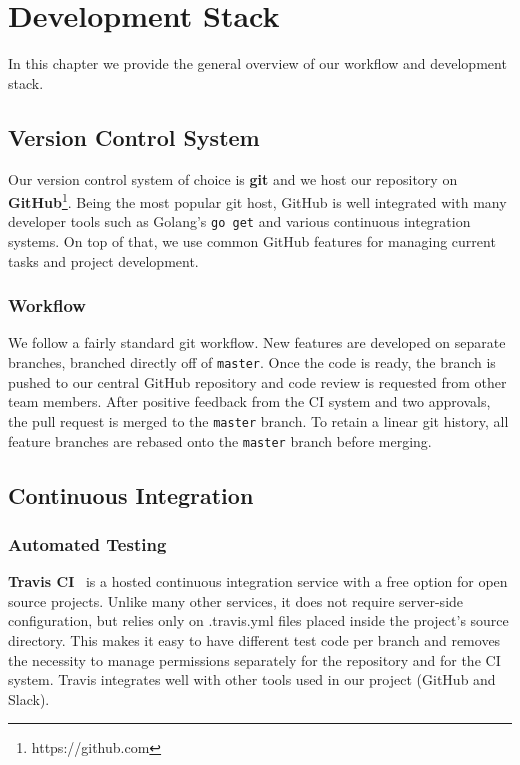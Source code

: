 \chapter{Development Stack}

In this chapter we provide the general overview of our workflow and
development stack.

\section{Version Control System}
Our version control system of choice is \textbf{git} and we host our repository on
\textbf{GitHub}\footnote{https://github.com}. Being the most popular git host,
GitHub is well integrated  with many developer tools such as Golang’s
\texttt{go get} and various continuous integration systems. On top of that,
we use common GitHub features for managing current tasks and project development.

\subsection{Workflow}
We follow a fairly standard git workflow. New features are developed on
separate branches, branched directly off of \texttt{master}. Once the code
is ready, the branch is pushed to our central GitHub repository and code
review is requested from other team members. After positive feedback from
the CI system and two approvals, the pull request is merged to the
\texttt{master} branch. To retain a linear git history, all feature branches
are rebased onto the \texttt{master} branch before merging.

\section{Continuous Integration}

\subsection{Automated Testing}
\textbf{Travis CI}~\cite{travis} is a hosted continuous integration service with
a free option for open source projects.
Unlike many other services, it does not require server-side
configuration, but relies only on .travis.yml files placed inside
the project's source directory. This makes it easy to have different test
code per branch and removes the necessity to manage permissions separately
for the repository and for the CI system. Travis integrates well with other
tools used in our project (GitHub and Slack).

